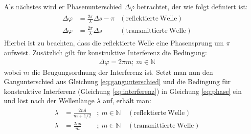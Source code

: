 Als nächstes wird er Phasenunterschied $\Delta \varphi$ betrachtet, der wie folgt definiert ist:
\begin{gather}
	\begin{aligned}
		 \Delta \varphi &= \frac{2\pi}{\lambda}\Delta s - \pi &\mathrm{(reflektierte~Welle)}\\
		 \Delta \varphi &= \frac{2\pi}{\lambda}\Delta s &\mathrm{(transmittierte~Welle)}
	\end{aligned}
	\label{eq:phase}
\end{gather}
Hierbei ist zu beachten, dass die reflektierte Welle eine Phasensprung um $\pi$ aufweist. Zusätzlich gilt für konstruktive Interferenz die Bedingung:
\begin{gather}
	\boxed{\Delta \varphi = 2\pi m;~m \in \mathbb{N}}
	\label{eq:interferenz}
\end{gather}
wobei $m$ die Beugungsordnung der Interferenz ist. Setzt man nun den Gangunterschied aus Gleichung \ref{eq:gangunterschied} und die Bedingung für konstruktive Interferenz (Gleichung \ref{eq:interferenz}) in Gleichung \ref{eq:phase} ein und löst nach der Wellenlänge $\lambda$ auf, erhält man: \cite{DemtroederOptik}
\begin{gather}
	\boxed{
	\begin{aligned}
		 \lambda &= \frac{2nd}{m + 1/2} &;~m \in \mathbb{N} ~&\mathrm{(reflektierte~Welle)}\\
		 \lambda &= \frac{2nd}{m}       &;~m \in \mathbb{N} ~&\mathrm{(transmittierte~Welle)}
	\end{aligned}
	}
	\label{eq:wavelength}
\end{gather}